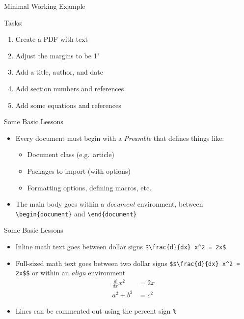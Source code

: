 \documentclass{beamer} %
\begin{document}
\begin{frame}{Minimal Working Example}

Tasks:
\begin{enumerate}
	\item Create a PDF with text
	\item Adjust the margins to be 1"
	\item Add a title, author, and date
	\item Add section numbers and references
	\item Add some equations and references
\end{enumerate}

\end{frame}

\begin{frame}{Some Basic Lessons}

\begin{itemize}
	\item Every document must begin with a \textit{Preamble} that defines things like:
	\begin{itemize}
		\item Document class (e.g.~article)
		\item Packages to import (with options)
		\item Formatting options, defining macros, etc.
	\end{itemize}
	\item The main body goes within a \textit{document} environment, between {\tt \textbackslash begin\{document\}} and {\tt \textbackslash end\{document\}}
\end{itemize}

\end{frame}

\begin{frame}{Some Basic Lessons}

\begin{itemize}
	\item Inline math text goes between dollar signs {\tt \$\textbackslash frac\{d\}\{dx\} x\^{}2 = 2x\$}
	\item Full-sized math text goes between two dollar signs {\tt \$\$\textbackslash frac\{d\}\{dx\} x\^{}2 = 2x\$\$} or within an \textit{align} environment
	\begin{align*}
		\frac{d}{dx} x^2 &= 2x \\
		a^2 + b^2 &= c^2
	\end{align*}
	\item Lines can be commented out using the percent sign \texttt{\%}
\end{itemize}

\end{frame}
\end{document}
